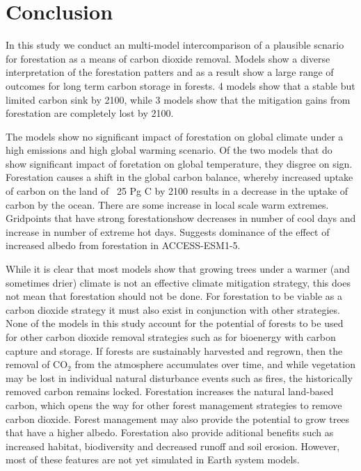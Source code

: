\documentclass[]{article}
\begin{document}
\section{Conclusion}

In this study we conduct an multi-model intercomparison of a plausible scnario for forestation as a means of carbon dioxide removal.
Models show a diverse interpretation of the forestation patters and as a result show a large range of outcomes for long term carbon storage in forests.
4 models show that a stable but limited carbon sink by 2100, while 3 models show that the mitigation gains from forestation are completely lost by 2100.

The models show no significant impact of forestation on global climate under a high emissions and high global warming scenario.
Of the two models that do show significant impact of foretation on global temperature, they disgree on sign.
Forestation causes a shift in the global carbon balance, whereby increased uptake of carbon on the land of ~25 Pg C by 2100 results in a decrease in the uptake of carbon by the ocean.
There are some increase in local scale warm extremes.
Gridpoints that have strong forestationshow decreases in number of cool days and increase in number of extreme hot days.
Suggests dominance of the effect of increased albedo from forestation in ACCESS-ESM1-5.

While it is clear that most models show that growing trees under a warmer (and sometimes drier) climate is not an effective climate mitigation strategy, this does not mean that forestation should not be done.
For forestation to be viable as a carbon dioxide strategy it must also exist in conjunction with other strategies.
None of the models in this study account for the potential of forests to be used for other carbon dioxide removal strategies such as for bioenergy with carbon capture and storage.
If forests are sustainably harvested and regrown, then the removal of CO$_2$ from the atmosphere accumulates over time, and while vegetation may be lost in individual natural disturbance events such as fires, the historically removed carbon remains locked.
Forestation increases the natural land-based carbon, which opens the way for other forest management strategies to remove carbon dioxide.
Forest management may also provide the potential to grow trees that have a higher albedo.
Forestation also provide aditional benefits such as increased habitat, biodiversity and decreased runoff and soil erosion.
However, most of these features are not yet simulated in Earth system models.
\end{document}
